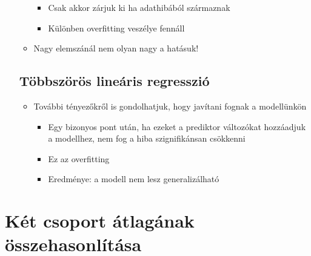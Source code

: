 \documentclass[
  letterpaper,
  DIV=11,
  numbers=noendperiod]{scrreprt}
\begin{document}
\begin{itemize}
\begin{itemize}
    \begin{itemize}
    \item
      Csak akkor zárjuk ki ha adathibából származnak
    \item
      Különben overfitting veszélye fennáll
    \end{itemize}
  \item
    Nagy elemszánál nem olyan nagy a hatásuk!
  \end{itemize}

  \hypertarget{tuxf6bbszuxf6ruxf6s-lineuxe1ris-regressziuxf3}{%
  \section{Többszörös lineáris
  regresszió}\label{tuxf6bbszuxf6ruxf6s-lineuxe1ris-regressziuxf3}}

  \begin{itemize}
  \item
    További tényezőkről is gondolhatjuk, hogy javítani fognak a
    modellünkön

    \begin{itemize}
    \item
      Egy bizonyos pont után, ha ezeket a prediktor változókat
      hozzáadjuk a modellhez, nem fog a hiba szignifikánsan csökkenni
    \item
      Ez az overfitting
    \item
      Eredménye: a modell nem lesz generalizálható
    \end{itemize}
  \end{itemize}
\end{itemize}


\hypertarget{kuxe9t-csoport-uxe1tlaguxe1nak-uxf6sszehasonluxedtuxe1sa}{%
\chapter{Két csoport átlagának
összehasonlítása}\label{kuxe9t-csoport-uxe1tlaguxe1nak-uxf6sszehasonluxedtuxe1sa}}
\end{document}

